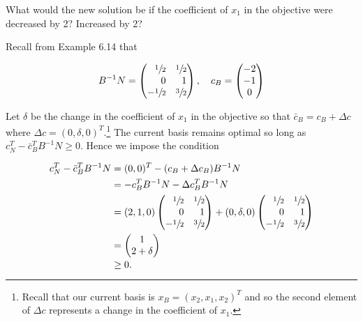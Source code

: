 What would the new solution be if the coefficient of $x_1$ in the objective were decreased by 2? Increased by 2?

\begin{solution}
  Recall from Example 6.14 that

  $$
  B^{-1} N = \begin{pmatrix*}[r]
     \sfrac{1}{2} & \sfrac{1}{2} \\
                0 &            1 \\
    -\sfrac{1}{2} & \sfrac{3}{2}
  \end{pmatrix*}, \quad c_B = \begin{pmatrix*}
    -2 \\
    -1 \\
     0
  \end{pmatrix*}
  $$

  Let $\delta$ be the change in the coefficient of $x_1$ in the objective so that $\bar{c}_B = c_B + \Delta c$ where 
  $\Delta c = (0, \delta, 0)^T$.\footnote{
    Recall that our current basis is $x_B = (x_2, x_1, x_2)^T$ and so the second element of $\Delta c$ represents a 
    change in the coefficient of $x_1$.
  } The current basis remains optimal so long as \linebreak
  $c_N^T - \bar{c}_B^T B^{-1} N \ge 0 $. Hence we impose the condition

  \begin{align*}
    c_N^T - \bar{c}_B^T B^{-1} N &= (0, 0)^T - (c_B + \Delta c_B) B^{-1} N \\
                                 &= -c_B^T B^{-1} N - \Delta c_B^T B^{-1} N \\
                                 &= (2, 1, 0) \begin{pmatrix*}[r]
                                        \sfrac{1}{2} & \sfrac{1}{2} \\
                                                   0 &            1 \\
                                       -\sfrac{1}{2} & \sfrac{3}{2}
                                    \end{pmatrix*} + (0, \delta, 0) \begin{pmatrix*}[r]
                                        \sfrac{1}{2} & \sfrac{1}{2} \\
                                                   0 &            1 \\
                                       -\sfrac{1}{2} & \sfrac{3}{2}
                                    \end{pmatrix*} \\
                                 &= \begin{pmatrix*}
                                      1 \\
                                      2 + \delta
                                    \end{pmatrix*} \\
                                 &\ge 0.
  \end{align*}


\end{solution}
